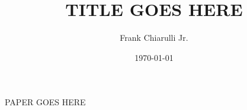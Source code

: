 \documentclass[10pt,letterpaper,oneside]{article}
\begin{document}
\title{TITLE GOES HERE}
\author{Frank Chiarulli Jr.}
\date{\today}
\maketitle

PAPER GOES HERE

\printbibliography
\end{document}
